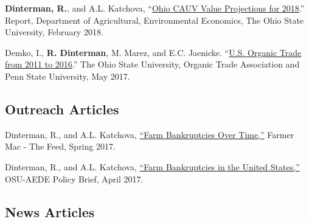 \documentclass[letterpaper]{article}
\renewenvironment{itemize}{
  \begin{list}{}{
    \setlength{\leftmargin}{1.5em}
  }
}{
  \end{list}
}
\begin{document}
\begin{itemize}
\item \textbf{Dinterman, R.}, and A.L. Katchova, ``\href{https://aede.osu.edu/sites/aede/files/publication_files/2018CAUVProjectionsReport.pdf}{Ohio CAUV Value Projections for 2018}.'' Report, Department of Agricultural, Environmental Economics, The Ohio State University, February 2018.
\item Demko, I., \textbf{R. Dinterman}, M. Marez, and E.C. Jaenicke. ``\href{https://ota.com/sites/default/files/indexed_files/OTATradeReport_10-30-2017.pdf}{U.S. Organic Trade from 2011 to 2016}.'' The Ohio State University, Organic Trade Association and Penn State University, May 2017.
\end{itemize}

% 

\subsection*{Outreach Articles}

\begin{itemize}
\item Dinterman, R., and A.L. Katchova, \href{https://www.farmermac.com/2017-spring-feed/mobile/index.html#p=1}{``Farm Bankruptcies Over Time,''} Farmer Mac - The Feed, Spring 2017.
\item Dinterman, R., and A.L. Katchova, \href{https://aede.osu.edu/sites/aede/files/publication_files/Farm%20Bankruptcies%20-%20Policy%20Brief.pdf}{``Farm Bankruptcies in the United States,''} OSU-AEDE Policy Brief, April 2017.
\end{itemize}

\subsection*{News Articles}
\end{document}
